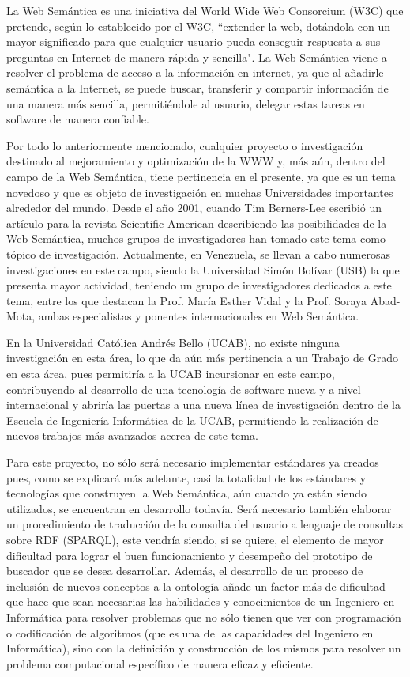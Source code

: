 La Web Semántica es una iniciativa del World Wide Web Consorcium (W3C) que pretende, según lo establecido por el W3C, ``extender la web, dotándola con un mayor significado para que cualquier usuario pueda conseguir respuesta a sus preguntas en Internet de manera rápida y sencilla". La Web Semántica viene a resolver el problema de acceso a la información en internet, ya que al añadirle semántica a la Internet, se puede buscar, transferir y compartir información de una manera más sencilla, permitiéndole al usuario, delegar estas tareas en software de manera confiable.

Por todo lo anteriormente mencionado, cualquier proyecto o investigación destinado al mejoramiento y optimización de la WWW y, más aún, dentro del campo de la Web Semántica, tiene pertinencia en el presente, ya que es un tema novedoso y que es objeto de investigación en muchas Universidades importantes alrededor del mundo. Desde el año 2001, cuando Tim Berners-Lee escribió un artículo para la revista Scientific American describiendo las posibilidades de la Web Semántica, muchos grupos de investigadores han tomado este tema como tópico de investigación. Actualmente, en Venezuela, se llevan a cabo numerosas investigaciones en este campo, siendo la Universidad Simón Bolívar (USB) la que presenta mayor actividad, teniendo un grupo de investigadores dedicados a este tema, entre los que destacan la Prof. María Esther Vidal y la Prof. Soraya Abad-Mota, ambas especialistas y ponentes internacionales en Web Semántica.

En la Universidad Católica Andrés Bello (UCAB), no existe ninguna investigación en esta área, lo que da aún más pertinencia a un Trabajo de Grado en esta área, pues permitiría a la UCAB incursionar en este campo, contribuyendo al desarrollo de una tecnología de software nueva y a nivel internacional y abriría las puertas a una nueva línea de investigación dentro de la Escuela de Ingeniería Informática de la UCAB, permitiendo la realización de nuevos trabajos más avanzados acerca de este tema.

Para este proyecto, no sólo será necesario implementar estándares ya creados pues, como se explicará más adelante, casi la totalidad de los estándares y tecnologías que construyen la Web Semántica, aún cuando ya están siendo utilizados, se encuentran en desarrollo todavía. Será necesario también elaborar un procedimiento de traducción de la consulta del usuario a lenguaje de consultas sobre RDF (SPARQL), este vendría siendo, si se quiere, el elemento de mayor dificultad para lograr el buen funcionamiento y desempeño del prototipo de buscador que se desea desarrollar. Además, el desarrollo de un proceso de inclusión de nuevos conceptos a la ontología añade un factor más de dificultad que hace que sean necesarias las habilidades y conocimientos de un Ingeniero en Informática para resolver problemas que no sólo tienen que ver con programación o codificación de algoritmos (que es una de las capacidades del Ingeniero en Informática), sino con la definición y construcción de los mismos para resolver un problema computacional específico de manera eficaz y eficiente.

